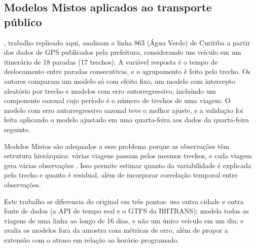 \subsection{Modelos Mistos aplicados ao transporte público}

\cite{courb}, trabalho replicado aqui, analisam a linha 863 (Água
Verde) de Curitiba a partir dos dados de GPS publicados pela prefeitura, considerando um
veículo em um itinerário de 18 paradas (17 trechos). A variável resposta é o tempo de
deslocamento entre paradas consecutivas, e o agrupamento é feito pelo trecho. Os autores
comparam um modelo só com efeito fixo, um modelo com intercepto aleatório por trecho e
modelos com erro autorregressivo, incluindo um componente sazonal cujo período é o número de
trechos de uma viagem. O modelo com erro autorregressivo sazonal teve o melhor ajuste, e a
validação foi feita aplicando o modelo ajustado em uma quarta-feira aos dados da
quarta-feira seguinte.

Modelos Mistos são adequados a esse problema porque as observações têm estrutura hierárquica:
várias viagens passam pelos mesmos trechos, e cada viagem gera várias observações
\cite{pinheiro2000}. Isso permite estimar quanto da variabilidade é explicada pelo trecho e
quanto é residual, além de incorporar correlação temporal entre observações.

Este trabalho se diferencia do original em três pontos: usa outra cidade e outra fonte de
dados (a API de tempo real e o GTFS da BHTRANS); modela todas as viagens de uma linha ao longo
de 16 dias, e não um único veículo em um dia; e avalia os modelos fora da amostra com métricas
de erro, além de propor a extensão com o atraso em relação ao horário programado.
